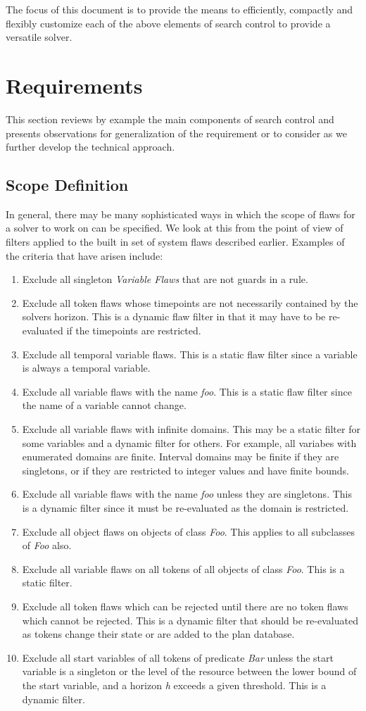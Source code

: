 \documentclass[10pt, letterpaper, oneside]{article}
\begin{document}
The focus of this document is to provide the means to efficiently, compactly and flexibly customize each of the above elements of search control to provide a versatile solver.

\section{Requirements}
This section reviews by example the main components of search control and presents observations for generalization of the requirement or to consider as we further develop the technical approach.
\subsection{Scope Definition}
In general, there may be many sophisticated ways in which the scope of flaws for a solver to work on can be specified. We look at this from the point of view of filters applied to the built in set of system flaws described earlier. Examples of the criteria that have arisen include:
\begin{enumerate}
\item Exclude all singleton {\em Variable Flaws} that are not guards in a rule.
\item Exclude all token flaws whose timepoints are not necessarily contained by the solvers horizon. This is a dynamic flaw filter in that it may have to be re-evaluated if the timepoints are restricted.
\item Exclude all temporal variable flaws. This is a static flaw filter since a variable is always a temporal variable.
\item Exclude all variable flaws with the name {\em foo}. This is a static flaw filter since the name of a variable cannot change.
\item Exclude all variable flaws with infinite domains. This may be a static filter for some variables and a dynamic filter for others. For example, all variabes with enumerated domains are finite. Interval domains may be finite if they are singletons, or if they are restricted to integer values and have finite bounds.
\item Exclude all variable flaws with the name {\em foo} unless they are singletons. This is a dynamic filter since it must be re-evaluated as the domain is restricted.
\item Exclude all object flaws on objects of class {\em Foo}. This applies to all subclasses of {\em Foo} also.
\item Exclude all variable flaws on all tokens of all objects of class {\em Foo}. This is a static filter.
\item Exclude all token flaws which can be rejected until there are no token flaws which cannot be rejected. This is a dynamic filter that should be re-evaluated as tokens change their state or are added to the plan database.
\item Exclude all start variables of all tokens of predicate {\em Bar} unless the start variable is a singleton or the level of the resource between the lower bound of the start variable, and a horizon {\em h} exceeds a given threshold. This is a dynamic filter.
\end{enumerate}
\end{document}
